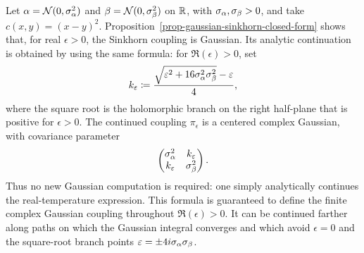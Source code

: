 \begin{example}
	Let $\alpha=\mathcal{N}(0,\sigma_\alpha^2)$ and $\beta=\mathcal{N}(0,\sigma_\beta^2)$ on $\mathbb{R}$, with $\sigma_\alpha,\sigma_\beta>0$, and take $c(x,y)=(x-y)^2$. Proposition~\ref{prop-gaussian-sinkhorn-closed-form} shows that, for real $\epsilon>0$, the Sinkhorn coupling is Gaussian. Its analytic continuation is obtained by using the same formula: for $\Re(\epsilon)>0$, set
	\[
		k_\varepsilon
		\coloneqq
		\frac{\sqrt{\varepsilon^2+16\sigma_\alpha^2\sigma_\beta^2}-\varepsilon}{4},
	\]
	where the square root is the holomorphic branch on the right half-plane that is positive for $\epsilon>0$. The continued coupling $\pi_\epsilon$ is a centered complex Gaussian, with covariance parameter
	\[
		\begin{pmatrix}
		\sigma_\alpha^2 & k_\varepsilon\\
		k_\varepsilon & \sigma_\beta^2
		\end{pmatrix}.
	\]
	Thus no new Gaussian computation is required: one simply analytically continues the real-temperature expression. This formula is guaranteed to define the finite complex Gaussian coupling throughout $\Re(\epsilon)>0$. It can be continued farther along paths on which the Gaussian integral converges and which avoid $\epsilon=0$ and the square-root branch points $\varepsilon=\pm4i\sigma_\alpha\sigma_\beta$.
\end{example}
